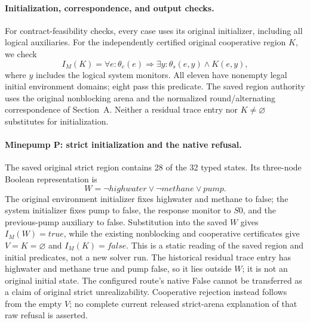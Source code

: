 \paragraph{Initialization, correspondence, and output checks.}
For contract-feasibility checks, every case uses its original initializer,
including all logical auxiliaries.
For the independently certified original cooperative region $K$, we check
\[
 I_M(K)=\forall e:\theta_e(e)\Rightarrow
              \exists y:\theta_s(e,y)\land K(e,y),
\]
where $y$ includes the logical system monitors. All eleven have nonempty
legal initial environment domains; eight pass this predicate. The saved
region authority uses the original nonblocking arena and the normalized
round/alternating correspondence of Section~A. Neither a residual trace
entry nor $K\ne\varnothing$ substitutes for initialization.

\paragraph{Minepump P: strict initialization and the native refusal.}
The saved original strict region contains 28 of the 32 typed states.
Its three-node Boolean representation is
\[
 W=\neg\mathit{highwater}\lor\neg\mathit{methane}\lor\mathit{pump}.
\]
The original environment initializer fixes highwater and methane to
false; the system initializer fixes pump to false, the response monitor
to $S0$, and the previous-pump auxiliary to false. Substitution into the
saved $W$ gives $I_M(W)=\mathit{true}$, while the existing nonblocking
and cooperative certificates give $V=K=\varnothing$ and $I_M(K)=\mathit{false}$.
This is a static reading of the saved region and initial predicates,
not a new solver run. The historical residual trace entry has
highwater and methane true and pump false, so it lies outside $W$;
it is not an original initial state. The configured route's native
False cannot be transferred as a claim of original strict
unrealizability. Cooperative rejection instead follows from the empty
$V$; no complete current released strict-arena explanation of that raw
refusal is asserted.

